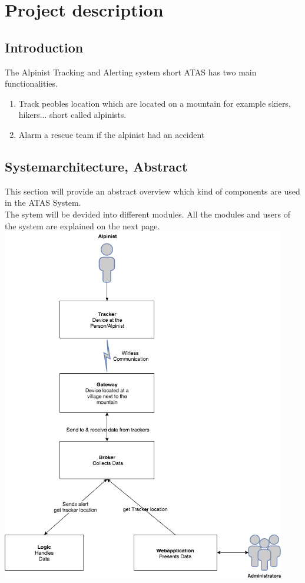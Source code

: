 \documentclass[a4paper,11pt, oneside]{report}
\theoremstyle{definition}
\begin{document}
\chapter{Project description}

\section{Introduction}
The Alpinist Tracking and Alerting system short ATAS has two main functionalities.
\begin{enumerate}
\item Track peobles location which are located on a mountain for example skiers, hikers... short called alpinists.
\item Alarm a rescue team if the alpinist had an accident
\end{enumerate}


\newpage
\section{Systemarchitecture, Abstract}
This section will provide an abstract overview which kind of components are used in the ATAS System.\\
The sytem will be devided into different modules. All the modules and users of the system are explained on the next page.\\

\includegraphics[width=0.93\textwidth]{img/ATAS_SystemOverview_Abstract.png}
\end{document}
